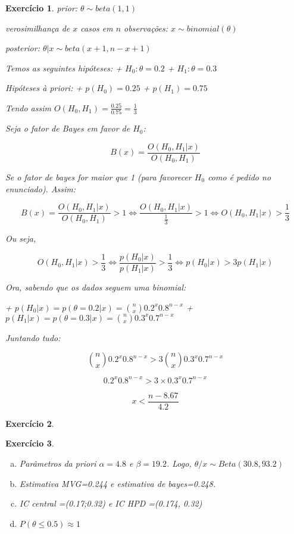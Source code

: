 \documentclass[letter,11pt]{article}
\newtheorem{exer}{Exercício}
\begin{document}
\begin{exer} \rm 
prior: $\theta \sim beta(1,1)$

verosimilhança de $x$ casos em $n$ observações: $x \sim binomial(\theta)$

posterior: $\theta | x \sim beta(x+1,n-x+1)$

Temos as seguintes hipóteses:
+ $H_0: \theta = 0.2$
+ $H_1: \theta = 0.3$

Hipóteses à priori:
+ $p(H_0) = 0.25$
+ $p(H_1) = 0.75$

Tendo assim $O(H_0,H_1) = \frac{0.25}{0.75} = \frac{1}{3}$

Seja o fator de Bayes em favor de $H_0$: 

$$B(x) = \frac{O(H_0,H_1|x)}{O(H_0,H_1)}$$

Se o fator de bayes for maior que 1 (para favorecer $H_0$ como é pedido no enunciado). Assim:

$$B(x) = \frac{O(H_0,H_1|x)}{O(H_0,H_1)} \gt 1 \iff \frac{O(H_0,H_1|x)}{\frac{1}{3}} \gt 1 \iff O(H_0,H_1|x) \gt \frac{1}{3}$$

Ou seja,

$$O(H_0,H_1|x) \gt \frac{1}{3} \iff \frac{p(H_0|x)}{p(H_1|x)} \gt \frac{1}{3}\iff p(H_0|x) \gt 3p(H_1|x)$$

Ora, sabendo que os dados seguem uma binomial:

+ $p(H_0|x) = p(\theta = 0.2|x) = \binom n x 0.2^x 0.8^{n-x}$
+ $p(H_1|x) = p(\theta = 0.3|x) = \binom n x 0.3^x 0.7^{n-x}$

Juntando tudo:

$$\binom n x 0.2^x 0.8^{n-x} \gt 3 \binom n x 0.3^x 0.7^{n-x}$$

$$0.2^x 0.8^{n-x} \gt 3 \times 0.3^x 0.7^{n-x}$$

$$x \lt \frac{n - 8.67}{4.2}$$
\end{exer}


\begin{exer} \rm
\end{exer}


\begin{exer} \rm
\begin{enumerate}[a)]
\item Parâmetros da priori $\alpha=4.8$ e 
$\beta=19.2 $. Logo, $\theta/x\sim Beta(30.8, 93.2)$

\item Estimativa MVG=0.244 e estimativa de bayes=0.248.

\item IC central =(0.17;0.32) e IC HPD =(0.174, 0.32)

\item $P(\theta \leq 0.5) \approx 1$
\end{enumerate}
\end{exer}
\end{document}
